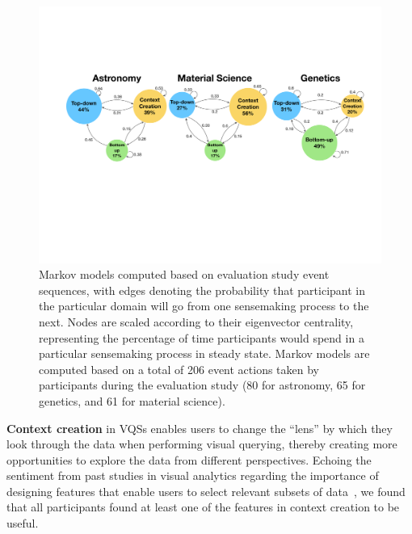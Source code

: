  \begin{figure}[ht!]
   \centering
   \includegraphics[width=0.6\linewidth]{figures/markov_transition.pdf}
   \caption{Markov models computed based on evaluation study event sequences, with edges denoting the probability that participant in the particular domain will go from one sensemaking process to the next. Nodes are scaled according to their eigenvector centrality, representing the percentage of time participants would spend in a particular sensemaking process in steady state. Markov models are computed based on a total of 206 event actions taken by participants during the evaluation study (80 for astronomy, 65 for genetics, and 61 for material science).}\label{fig:transition}
   \vspace*{-15pt}
 \end{figure}
 \par \textbf{Context creation} in VQSs enables users to change the ``lens''
 by which they look through the data
 when performing visual querying,
 thereby creating more opportunities
 to explore the data from different perspectives. Echoing the sentiment from past studies in visual analytics regarding the importance of designing features that enable users to select relevant subsets of data~\cite{Shneiderman1994,Amar2005,Heer2012}, we found that all participants found at least one of the features in context creation to be useful.
